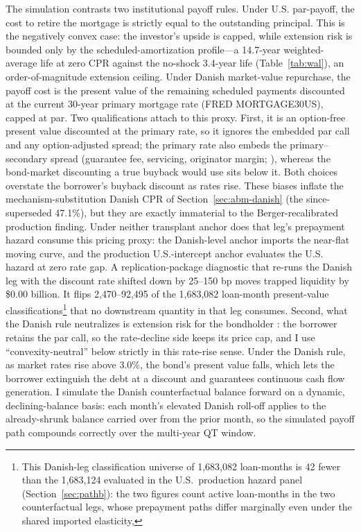 \documentclass[12pt]{article}
\begin{document}
The simulation contrasts two institutional payoff rules. Under U.S. par-payoff, the cost to retire the mortgage is strictly equal to the outstanding principal. This is the negatively convex case: the investor's upside is capped, while extension risk is bounded only by the scheduled-amortization profile---a 14.7-year weighted-average life at zero CPR against the no-shock 3.4-year life (Table~\ref{tab:wal}), an order-of-magnitude extension ceiling. Under Danish market-value repurchase, the payoff cost is the present value of the remaining scheduled payments discounted at the current 30-year primary mortgage rate (FRED MORTGAGE30US), capped at par. Two qualifications attach to this proxy. First, it is an option-free present value discounted at the primary rate, so it ignores the embedded par call and any option-adjusted spread; the primary rate also embeds the primary--secondary spread (guarantee fee, servicing, originator margin; \citealp{fuster2013}), whereas the bond-market discounting a true buyback would use sits below it. Both choices overstate the borrower's buyback discount as rates rise. These biases inflate the mechanism-substitution Danish CPR of Section~\ref{sec:abm-danish} (the since-superseded 47.1\%), but they are exactly immaterial to the Berger-recalibrated production finding. Under neither transplant anchor does that leg's prepayment hazard consume this pricing proxy: the Danish-level anchor imports the near-flat moving curve, and the production U.S.-intercept anchor evaluates the U.S. hazard at zero rate gap. A replication-package diagnostic that re-runs the Danish leg with the discount rate shifted down by 25--150 bp moves trapped liquidity by \$0.00 billion. It flips 2,470--92,495 of the 1,683,082 loan-month present-value classifications\footnote{This Danish-leg classification universe of 1{,}683{,}082 loan-months is 42 fewer than the 1{,}683{,}124 evaluated in the U.S.\ production hazard panel (Section~\ref{sec:pathb}): the two figures count active loan-months in the two counterfactual legs, whose prepayment paths differ marginally even under the shared imported elasticity,} that no downstream quantity in that leg consumes. Second, what the Danish rule neutralizes is extension risk for the bondholder \citep{berger2026}: the borrower retains the par call, so the rate-decline side keeps its price cap, and I use ``convexity-neutral'' below strictly in this rate-rise sense. Under the Danish rule, as market rates rise above 3.0\%, the bond's present value falls, which lets the borrower extinguish the debt at a discount and guarantees continuous cash flow generation. I simulate the Danish counterfactual balance forward on a dynamic, declining-balance basis: each month's elevated Danish roll-off applies to the already-shrunk balance carried over from the prior month, so the simulated payoff path compounds correctly over the multi-year QT window.
\end{document}
